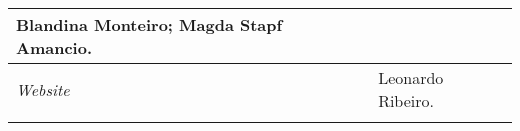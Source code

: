 \documentclass{gescons}
\begin{document}
\begin{longtable}[]{@{}
  >{\raggedright\arraybackslash}p{}
  >{\raggedright\arraybackslash}p{}@{}}
\begin{minipage}[t]{\linewidth}
Blandina Monteiro; Magda Stapf Amancio.
\end{minipage} \\
\hline
\begin{minipage}[t]{\linewidth}\raggedright
\emph{Website}
\end{minipage} & \begin{minipage}[t]{\linewidth}\raggedright
Leonardo Ribeiro.
\end{minipage} \\
\midrule\noalign{}
\endhead
\bottomrule\noalign{}
\endlastfoot
\end{longtable}


        
\end{document}
